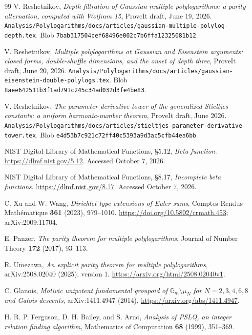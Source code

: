 \documentclass[11pt]{article}
\numberwithin{equation}{section}
\theoremstyle{definition}\newtheorem{definition}[theorem]{Definition}
\theoremstyle{remark}\newtheorem{remark}[theorem]{Remark}
\newcommand{\src}[1]{\nolinkurl{#1}}
\begin{document}
\begin{thebibliography}{99}
V. Reshetnikov, \emph{Depth filtration of Gaussian multiple polylogarithms: a parity alternation, computed with Wolfram 15}, ProveIt draft, June 19, 2026.
\src{Analysis/Polylogarithms/docs/articles/gaussian-multiple-polylog-depth.tex}.
Blob \src{7bab317504cef68496e002c7b6ffa12325081b12}.

V. Reshetnikov, \emph{Multiple polylogarithms at Gaussian and Eisenstein arguments: closed forms, double-shuffle dimensions, and the onset of depth three}, ProveIt draft, June 20, 2026.
\src{Analysis/Polylogarithms/docs/articles/gaussian-eisenstein-double-polylogs.tex}.
Blob \src{8aee642511b3f1ad791c245c34ad032d3fe4be83}.

V. Reshetnikov, \emph{The parameter-derivative tower of the generalized Stieltjes constants: a uniform harmonic-number theorem}, ProveIt draft, June 2026.
\src{Analysis/Polylogarithms/docs/articles/stieltjes-parameter-derivative-tower.tex}.
Blob \src{e4d53b7c921c72ff40c5393a9d3ac5cfb44ea6bb}.

NIST Digital Library of Mathematical Functions, \S5.12, \emph{Beta function}.
\url{https://dlmf.nist.gov/5.12}. Accessed October 7, 2026.

NIST Digital Library of Mathematical Functions, \S8.17, \emph{Incomplete beta functions}.
\url{https://dlmf.nist.gov/8.17}. Accessed October 7, 2026.

C. Xu and W. Wang, \emph{Dirichlet type extensions of Euler sums},
Comptes Rendus Math\'ematique \textbf{361} (2023), 979--1010.
\url{https://doi.org/10.5802/crmath.453}; arXiv:2009.11704.

E. Panzer, \emph{The parity theorem for multiple polylogarithms},
Journal of Number Theory \textbf{172} (2017), 93--113.

R. Umezawa, \emph{An explicit parity theorem for multiple polylogarithms},
arXiv:2508.02040 (2025), version 1.
\url{https://arxiv.org/html/2508.02040v1}.

C. Glanois, \emph{Motivic unipotent fundamental groupoid of
$\mathbb G_m\setminus\mu_N$ for $N=2,3,4,6,8$ and Galois descents},
arXiv:1411.4947 (2014).
\url{https://arxiv.org/abs/1411.4947}.

H. R. P. Ferguson, D. H. Bailey, and S. Arno,
\emph{Analysis of PSLQ, an integer relation finding algorithm},
Mathematics of Computation \textbf{68} (1999), 351--369.
\end{thebibliography}
\end{document}
